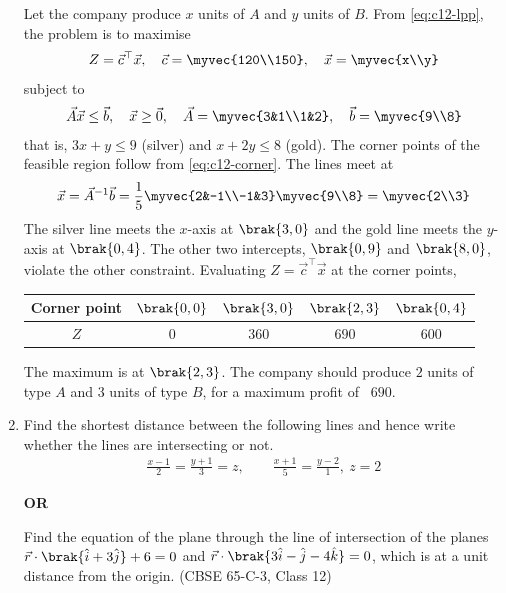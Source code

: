 \begin{enumerate}[label=\thesubsection.\arabic*., ref=\thesubsection.\theenumi]
\solution Let the company produce $x$ units of $A$ and $y$ units of $B$. From \eqref{eq:c12-lpp}, the problem is to maximise
\begin{align}
Z = \vec{c}^{\top}\vec{x},\quad
\vec{c} = \myvec{120\\150},\quad \vec{x}=\myvec{x\\y}
\end{align}
subject to
\begin{align}
\vec{A}\vec{x}\le\vec{b},\quad \vec{x}\ge\vec{0},\quad
\vec{A} = \myvec{3&1\\1&2},\quad \vec{b} = \myvec{9\\8}
\end{align}
that is, $3x+y\le 9$ (silver) and $x+2y\le 8$ (gold). The corner points of the feasible region follow from \eqref{eq:c12-corner}. The lines meet at
\begin{align}
\vec{x} = \vec{A}^{-1}\vec{b}
= \frac{1}{5}\myvec{2&-1\\-1&3}\myvec{9\\8} = \myvec{2\\3}
\end{align}
The silver line meets the $x$-axis at $\brak{3,0}$ and the gold line meets the $y$-axis at $\brak{0,4}$. The other two intercepts, $\brak{0,9}$ and $\brak{8,0}$, violate the other constraint. Evaluating $Z=\vec{c}^{\top}\vec{x}$ at the corner points,
\begin{center}
\begin{tabular}{|c|c|c|c|c|}
\hline
Corner point & $\brak{0,0}$ & $\brak{3,0}$ & $\brak{2,3}$ & $\brak{0,4}$ \\
\hline
$Z$ & $0$ & $360$ & $690$ & $600$ \\
\hline
\end{tabular}
\end{center}
The maximum is at $\brak{2,3}$. The company should produce $2$ units of type $A$ and $3$ units of type $B$, for a maximum profit of \rupee~$690$.
 
\begin{center}
\end{center}
 
\item Find the shortest distance between the following lines and hence write whether the lines are intersecting or not.
\begin{align*}
\frac{x-1}{2} = \frac{y+1}{3} = z,\qquad
\frac{x+1}{5} = \frac{y-2}{1},\ z=2
\end{align*}
\begin{center}\textbf{OR}\end{center}
Find the equation of the plane through the line of intersection of the planes $\vec{r}\cdot\brak{\hat{i}+3\hat{j}}+6=0$ and $\vec{r}\cdot\brak{3\hat{i}-\hat{j}-4\hat{k}}=0$, which is at a unit distance from the origin.
\hfill (CBSE 65-C-3, Class 12)
 

\end{enumerate}
